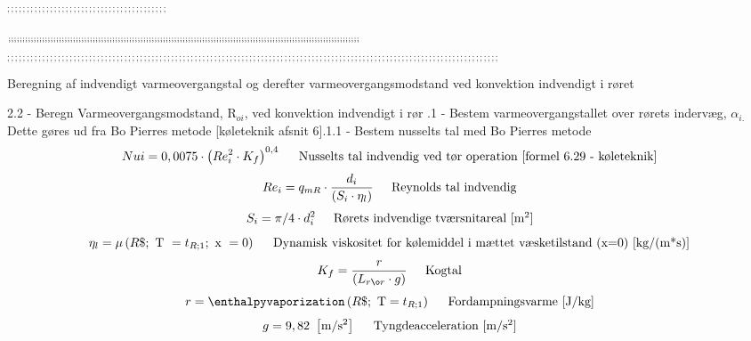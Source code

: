 \documentclass[../Hovedrapport.tex]{subfiles}
\newcommand{\F}[1]{\mbox{$#1$}}
\newcommand{\V}[1]{\mbox{$ #1 $}}
\newcommand{\I}{\mbox{\hspace{0.20in}}}
\newcommand{\viscosity}{\mathrm{\mu}}
\begin{document}
\vspace{0.10in}
\noindent
\rm $_{;;;;;;;;;;;;;;;;;;;;;;;;;;;;;;;;;;;;;;;;;}$

\vspace{0.10in}
\noindent
\rm $_{;;;;;;;;;;;;;;;;;;;;;;;;;;;;;;;;;;;;;;;;;;;;;;;;;;;;;;;;;;;;;;;;;;;;;;;;;;;;;;;;;;;;;;;;;;;;;;;;;;;;;;;;;;;;;;;;;;;;;;;;;;;;;\newline}$
$_{;;;;;;;;;;;;;;;;;;;;;;;;;;;;;;;;;;;;;;;;;;;;;;;;;;;;;;;;;;;;;;;;;;;;;;;;;;;;;;;;;;;;;;;;;;;;;;;;;;;;;;;;;;;;;;;;;;;;;;;;;;;;;;}$

\vspace{0.10in}
\noindent
\rm Beregning af indvendigt varmeovergangstal og derefter varmeovergangsmodstand ved konvektion indvendigt i røret

\vspace{0.10in}
\noindent


\rm 2.2 - Beregn Varmeovergangsmodstand, R$_{oi}$, ved konvektion indvendigt i rør\newline
 .1 - Bestem varmeovergangstallet over rørets indervæg, $\alpha$$_{i.}$ Dette gøres ud fra Bo Pierres metode [køleteknik afsnit 6].1.1 - Bestem nusselts tal med Bo Pierres metode
\begin{equation}
\label{EES Eqn:54}
\V{Nui}  = 0,0075 \cdot   \left( \V{Re} _{i}^{2} \cdot  K_{f} \right) ^{0,4}	 
\mbox{\I Nusselts tal indvendig ved tør operation [formel 6.29 - køleteknik]}
\end{equation}
\begin{equation}
\label{EES Eqn:55}
\V{Re} _{i} = q_{mR} \cdot  \frac {d_{i}}{  \left( S_{i} \cdot  \eta_{l} \right) 	 } 
\mbox{\I Reynolds tal indvendig}
\end{equation}
\begin{equation}
\label{EES Eqn:56}
S_{i} = \pi/4\cdot  d_{i}^{2}	 
\mbox{\I Rørets indvendige tværsnitareal [m$^{2}$]}
\end{equation}
\begin{equation}
\label{EES Eqn:57}
\eta_{l} = \viscosity \left(\F{R}\$;\mbox{\ T }= t_{R;1};\mbox{\ x }= 0 \right) 	 
\mbox{\I Dynamisk viskositet for kølemiddel i mættet væsketilstand (x=0) [kg/(m*s)]}
\end{equation}
\begin{equation}
\label{EES Eqn:58}
K_{f} = \frac {r}{  \left( L_{rør}\cdot g \right) 	 } 
\mbox{\I Kogtal}
\end{equation}
\begin{equation}
\label{EES Eqn:59}
r = \enthalpyvaporization \left(\F{R}\$;\mbox{\ T}=t_{R;1} \right) 	 
\mbox{\I Fordampningsvarme [J/kg]}
\end{equation}
\begin{equation}
\label{EES Eqn:60}
g = 9,82   \   \left[ \rm m/s^{2} \right]	 
\mbox{\I Tyngdeacceleration [m/s$^{2}$]}
\end{equation}
\end{document}
